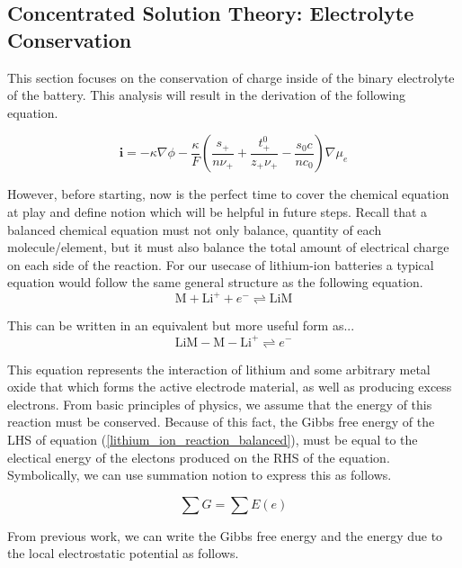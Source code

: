 \documentclass[lettersize,journal]{IEEEtran}
\begin{document}
\subsection{Concentrated Solution Theory: Electrolyte Conservation}

This section focuses on the conservation of charge inside of the binary electrolyte of the battery. This analysis will result in the derivation of the following equation.

\begin{equation}
\mathbf{i}=-\kappa \nabla \phi-\frac{\kappa}{F}\left(\frac{s_{+}}{n \nu_{+}}+\frac{t_{+}^{0}}{z_{+} \nu_{+}}-\frac{s_{0} c}{n c_{0}}\right) \nabla \mu_{e}
\end{equation}


However, before starting, now is the perfect time to cover the chemical equation at play and define notion which will be helpful in future steps. Recall that a balanced chemical equation must not only balance, quantity of each molecule/element, but it must also balance the total amount of electrical charge on each side of the reaction. For our usecase of lithium-ion batteries a typical equation would follow the same general structure as the following equation.
\begin{equation}
\mathrm{M}+\mathrm{Li}^{+}+e^{-} \rightleftharpoons \mathrm{LiM}
\end{equation}

This can be written in an equivalent but more useful form as...
\begin{equation}\label{lithium_ion_reaction_balanced}
\mathrm{LiM}-\mathrm{M}-\mathrm{Li}^{+} \rightleftharpoons e^{-}
\end{equation}

This equation represents the interaction of lithium and some arbitrary metal oxide that which forms the active electrode material, as well as producing excess electrons. From basic principles of physics, we assume that the energy of this reaction must be conserved. Because of this fact, the Gibbs free energy of the LHS of equation (\ref{lithium_ion_reaction_balanced}), must be equal to the electical energy of the electons produced on the RHS of the equation. Symbolically, we can use summation notion to express this as follows.

\begin{equation}
  \sum{G} = \sum{E(e)}
\end{equation}

From previous work, we can write the Gibbs free energy and the energy due to the local electrostatic potential as follows.
\end{document}
